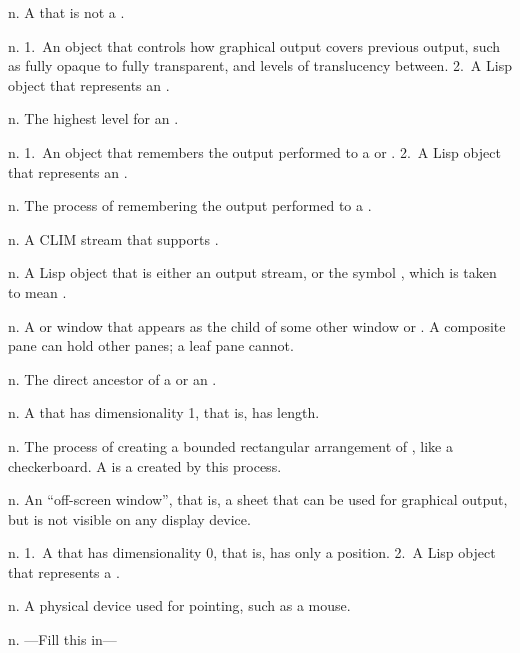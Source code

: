 \begin{description}
 {n.} {A  that is not a
.}

 {n.} {1.~An object that controls how graphical output
covers previous output, such as fully opaque to fully transparent, and levels of
translucency between.  2.~A Lisp object that represents an .}

 {n.} {The highest level  for
an .}

 {n.} {1.~An object that remembers the output
performed to a  or .  2.~A Lisp object that represents
an .}

 {n.} {The process of remembering the output
performed to a .}

 {n.} {A CLIM stream that supports
.}

 {n.} {A Lisp object that is either an
output stream, or the symbol , which is taken to mean
.}

 {n.} {A  or window that appears as the child
of some other window or .  A composite pane can hold other panes; a
leaf pane cannot.}

 {n.} {The direct ancestor of a  or an
.}

 {n.} {A  that has dimensionality 1, that is,
has length.}

 {n.} {The process of creating a bounded rectangular
arrangement of , like a checkerboard.  A  is a
 created by this process.}

 {n.} {An ``off-screen window'', that is, a sheet that
can be used for graphical output, but is not visible on any display device.}

 {n.} {1.~A  that has dimensionality 0, that
is, has only a position.  2.~A Lisp object that represents a .}

 {n.} {A physical device used for pointing, such as a
mouse.} 

 {n.} {---Fill this in---}


\end{description}
